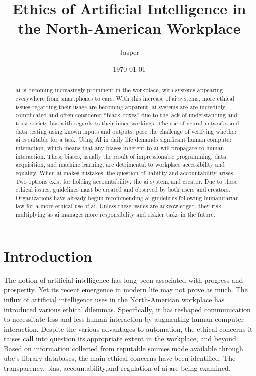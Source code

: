 \documentclass[11pt]{article}
\author{Jasper}
\date{\today}
\title{Ethics of Artificial Intelligence in the North-American Workplace}
\begin{document}
\maketitle
\tableofcontents

\listoftables
\listoffigures

\glsaddall \printglossary[type=\acronymtype]


\begin{abstract}
\gls{ai} is becoming increasingly prominent in the workplace, with systems appearing everywhere from smartphones to cars. 
With this increase of \gls{ai} systems, more ethical issues regarding their usage are becoming apparent. 
\gls{ai} systems are are incredibly complicated and often considered “black boxes” due to the lack of understanding and trust society has with regards to their inner workings. 
The use of neural networks and data testing using known inputs and outputs, pose the challenge of verifying whether \gls{ai} is suitable for a task. 
Using AI in daily life demands significant  human computer interaction, which means that any biases inherent to \gls{ai} will propagate to human interaction. 
These biases, usually the result of impressionable programming, data acquisition, and machine learning, are detrimental to workplace accessibility and equality. 
When \gls{ai} makes mistakes, the question of liability and accountability arises. 
Two options exist for holding accountability: the \gls{ai} system, and creator. 
Due to these ethical issues, guidelines must be created and observed by both users and creators. 
Organizations have already begun recommending \gls{ai} guidelines following humanitarian law for a more ethical use of \gls{ai}. 
Unless these issues are acknowledged, they risk multiplying as \gls{ai} manages more responsibility and riskier tasks in the future. 
\end{abstract}

\section{Introduction}
\label{sec:orgff7efbb}
The notion of artificial intelligence has long been associated with progress and prosperity. 
Yet its recent emergence in modern life may not prove as much. 
The influx of artificial intelligence uses in the North-American workplace has introduced various ethical dilemmas. 
Specifically, it has reshaped communication to necessitate less and less human interaction by augmenting human-computer interaction. 
Despite the various advantages to automation, the ethical concerns it raises call into question its appropriate extent in the workplace, and beyond. 
Based on information collected from reputable sources made available through \gls{ubc}’s library databases, the main ethical concerns have been identified. 
The transparency, bias, accountability,and regulation of \gls{ai} are being examined. 
\end{document}
